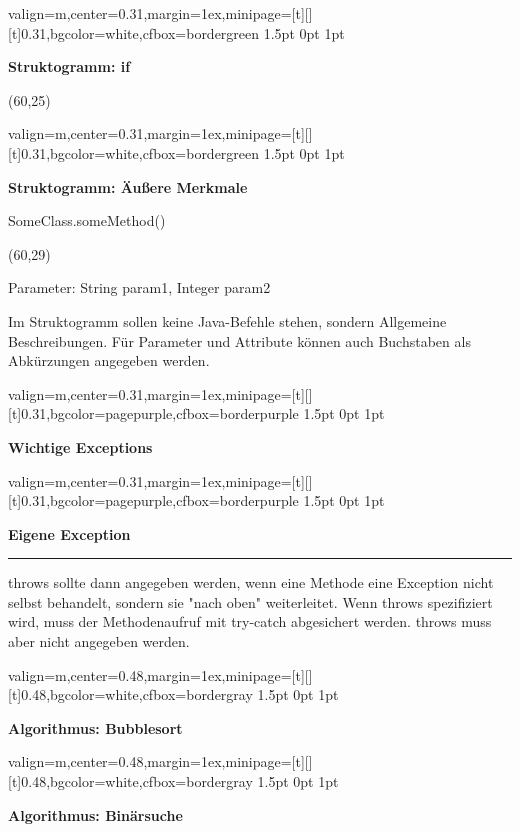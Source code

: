 \documentclass[11pt, a4paper, landscape]{article}
\newcommand{\fancyheader}[1]{
	\centerline{\sffamily \textbf{ \large #1}}
}
\newenvironment{fancybox}[2]
{
	\begin{adjustbox}{valign=m,center=0.31\textwidth,margin=1ex,minipage=[t][][t]{0.31\textwidth},bgcolor=#1,cfbox=#2 1.5pt 0pt 1pt}
	\begin{centering}
}
{
	\end{centering}
	\end{adjustbox}
}
\newenvironment{fancyboxwide}[2]
{
	\begin{adjustbox}{valign=m,center=0.48\textwidth,margin=1ex,minipage=[t][][t]{0.48\textwidth},bgcolor=#1,cfbox=#2 1.5pt 0pt 1pt}
	\begin{centering}
}
{
	\end{centering}
	\end{adjustbox}
}
\begin{document}
\begin{multicols}{3}
\begin{fancybox}{white}{bordergreen}
\fancyheader{Struktogramm: if}
\vspace{10pt}
\begin{center}
\begin{struktogramm}(60,25)
		\change
	\ifend
\end{struktogramm}
\end{center}
\end{fancybox}

\begin{fancybox}{white}{bordergreen}
\fancyheader{Struktogramm: Äußere Merkmale}
\vspace{10pt}
\raggedright {\ttfamily SomeClass.someMethod()}
\begin{center}
\begin{struktogramm}(60,29)
			\change
		\ifend
	\whileend
\end{struktogramm}
\end{center}
\raggedright {\ttfamily Parameter: String param1, Integer param2} \newline

Im Struktogramm sollen keine Java-Befehle stehen, sondern Allgemeine Beschreibungen. Für Parameter und Attribute können auch Buchstaben als Abkürzungen angegeben werden.
\end{fancybox}

\begin{fancybox}{pagepurple}{borderpurple}
\fancyheader{Wichtige Exceptions}

\end{fancybox}

\begin{fancybox}{pagepurple}{borderpurple}
\fancyheader{Eigene Exception}

\noindent\rule{8cm}{0.6pt}

\raggedright {
	{\ttfamily throws} sollte dann angegeben werden, wenn eine Methode eine Exception nicht selbst behandelt, sondern sie "nach oben" weiterleitet. Wenn throws spezifiziert wird, muss der Methodenaufruf mit try-catch abgesichert werden. {\ttfamily throws} muss aber nicht angegeben werden.
}

\end{fancybox}

\newpage
\end{multicols}

\begin{fancyboxwide}{white}{bordergray}
\fancyheader{Algorithmus: Bubblesort}

\end{fancyboxwide}

\begin{multicols}{2}
\begin{fancyboxwide}{white}{bordergray}
\fancyheader{Algorithmus: Binärsuche}

\end{fancyboxwide}
\end{multicols}
\end{document}
